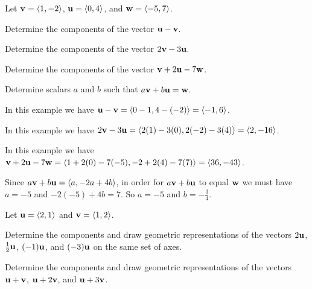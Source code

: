 \begin{exercises} 

\item \label{Ez:9.2.1}   Let $\mathbf{v} = \langle 1, -2 \rangle$, $\mathbf{u} = \langle 0, 4 \rangle$, and $\mathbf{w} = \langle -5, 7 \rangle$.

    \ba
    	\item Determine the components of the vector $\mathbf{u} - \mathbf{v}$.
        \item Determine the components of the vector $2\mathbf{v} - 3\mathbf{u}$.
        \item Determine the components of the vector $\mathbf{v} + 2\mathbf{u} - 7 \mathbf{w}$.
        \item Determine scalars $a$ and $b$ such that $a \mathbf{v} + b\mathbf{u} = \mathbf{w}.$
    \ea

\begin{exerciseSolution}
    \ba
    	\item In this example we have $\mathbf{u} - \mathbf{v} = \langle 0-1, 4-(-2) \rangle = \langle -1, 6 \rangle$.
        \item In this example we have $2\mathbf{v} - 3\mathbf{u} = \langle 2(1)-3(0), 2(-2)-3(4) \rangle = \langle 2, -16 \rangle$.
        \item In this example we have $\mathbf{v} + 2\mathbf{u} - 7 \mathbf{w} = \langle 1+2(0)-7(-5), -2+2(4)-7(7) \rangle = \langle 36, -43 \rangle$.
        \item Since $a \mathbf{v} + b\mathbf{u} = \langle a, -2a+4b \rangle$, in order for $a \mathbf{v} + b\mathbf{u}$ to equal $\mathbf{w}$ we must have $a=-5$ and $-2(-5)+4b = 7$. So $a=-5$ and $b = -\frac{3}{4}$.  
    \ea
\end{exerciseSolution}


\item \label{Ez:9.2.2}  Let $\mathbf{u} = \langle 2, 1 \rangle $ and $\mathbf{v} = \langle 1, 2 \rangle$.


    \ba
    \item Determine the components and draw geometric representations of the vectors $2\mathbf{u}$, $\frac{1}{2}\mathbf{u}$, $(-1)\mathbf{u}$, and $(-3)\mathbf{u}$ on the same set of axes.

    \item Determine the components and draw geometric representations of the vectors $\mathbf{u} + \mathbf{v}$, $\mathbf{u} + 2\mathbf{v}$, and $\mathbf{u} + 3\mathbf{v}$.
    

\end{exercises}
